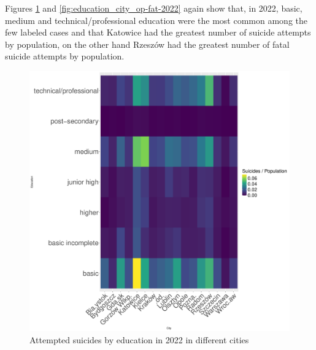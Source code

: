 \documentclass{article}
\begin{document}
Figures \ref{fig:education_city_op-att-2022} and \ref{fig:education_city_op-fat-2022}
again show that, in 2022, basic, medium and technical/professional education were the most common
among the few labeled cases and that Katowice had the greatest number of suicide attempts by population,
on the other hand Rzeszów had the greatest number of fatal suicide attempts by population.
\begin{figure}[H]
    \centering
    \begin{minipage}{0.55\textwidth}
        \includegraphics[width=\textwidth]{imgs/education_city_op-att-2022.pdf}
        \caption{Attempted suicides by education  in 2022 in different cities}
	\label{fig:education_city_op-att-2022}
    \end{minipage}
    \hfill
    \begin{minipage}{0.55\textwidth}

\end{minipage}
\end{figure}
\end{document}
